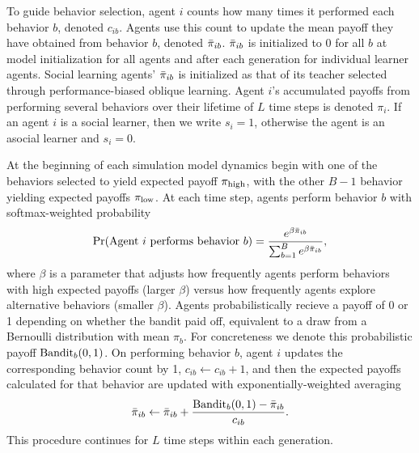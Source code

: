 \documentclass[letterpaper,11.5pt]{scrartcl}
\begin{document}
To guide behavior selection, agent $i$ counts how many times it
performed each behavior $b$, denoted $c_{ib}$. Agents use this count to 
update the mean payoff they have obtained from behavior $b$, denoted $\bar\pi_{ib}$.
$\bar\pi_{ib}$ is initialized to 0 for all $b$ at model initialization for
all agents and after each generation for individual learner agents. Social
learning agents' $\bar\pi_{ib}$ is initialized as that of its teacher selected
through performance-biased oblique learning. Agent $i$'s accumulated payoffs
from performing several behaviors over their lifetime of $L$ time steps is
denoted $\pi_{i}$. If an agent $i$ is a social learner, then we write $s_i = 1$,
otherwise the agent is an asocial learner and $s_i = 0$.

At the beginning of each simulation model dynamics begin with 
one of the behaviors selected to 
yield expected payoff $\pi_{\mathrm{high}}$, with the other $B-1$ behavior yielding
expected payoffs $\pi_{\mathrm{low}}$. At each time step, agents perform behavior $b$ 
with softmax-weighted probability
\begin{equation}
  \Pr(\text{Agent $i$ performs behavior $b$}) = 
    \frac{e^{\beta \bar\pi_{ib}}}{\sum_{b=1}^B e^{\beta \bar\pi_{ib}}},
\end{equation}
\noindent
where $\beta$ is a parameter that adjusts how frequently agents perform 
behaviors with high expected payoffs (larger $\beta$) versus how frequently
agents explore alternative behaviors (smaller $\beta$). 
Agents probabilistically recieve a payoff of 0 or 1 depending on whether the
bandit paid off, equivalent to a draw from a Bernoulli distribution with 
mean $\pi_b$. For concreteness we denote this probabilistic payoff
$\text{Bandit}_b(0, 1)$. On performing behavior $b$, agent $i$ updates the
corresponding behavior count by 1, $c_{ib} \leftarrow c_{ib} + 1$, and then
the expected payoffs calculated for that behavior are updated with
exponentially-weighted averaging
\begin{equation}
  \bar\pi_{ib} \leftarrow \bar\pi_{ib} + \frac{\text{Bandit}_b(0, 1) - \bar\pi_{ib}}{c_{ib}}.
\end{equation}
\noindent
This procedure continues for $L$ time steps within each generation.
\end{document}
